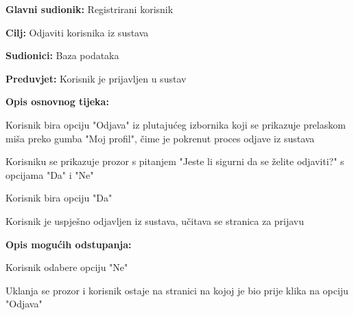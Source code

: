 					\noindent {}
					\begin{packed_item}
						
						\item \textbf{Glavni sudionik: } Registrirani korisnik
						\item  \textbf{Cilj:} Odjaviti korisnika iz sustava
						\item  \textbf{Sudionici:} Baza podataka
						\item  \textbf{Preduvjet:} Korisnik je prijavljen u sustav
						\item  \textbf{Opis osnovnog tijeka:}
						
						\item[] \begin{packed_enum}
							
							\item Korisnik bira opciju "Odjava" iz plutajućeg izbornika koji se prikazuje prelaskom miša preko gumba "Moj profil", čime je pokrenut proces odjave iz sustava
							\item Korisniku se prikazuje prozor s pitanjem "Jeste li sigurni da se želite odjaviti?" s opcijama "Da" i "Ne"
							\item Korisnik bira opciju "Da"
							\item Korisnik je uspješno odjavljen iz sustava, učitava se stranica za prijavu
							
						\end{packed_enum}

						\item \textbf{Opis mogućih odstupanja:}
						\item[] \begin{packed_enum}

							\item[3.a] Korisnik odabere opciju "Ne"
							\item[] \begin{packed_enum}
								\item[1.] Uklanja se prozor i korisnik ostaje na stranici na kojoj je bio prije klika na opciju "Odjava"
							\end{packed_enum}
						\end{packed_enum}
						
					\end{packed_item}

